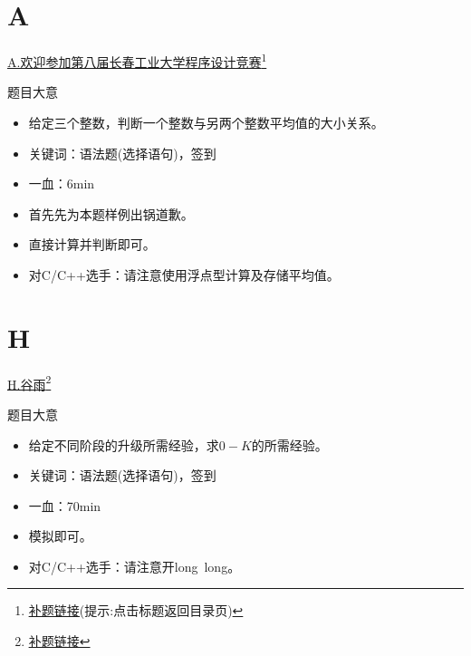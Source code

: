 \documentclass{beamer}
\begin{document}
    \section{A}
    \hypertarget{A}{}
    \begin{frame}{\hyperlink{toc}{A.欢迎参加第八届长春工业大学程序设计竞赛}\footnote{\href{https://acm816.cn/p/236}{\underline{补题链接}}(提示:点击标题返回目录页)}}
        \begin{block}{题目大意}
            \begin{itemize}
                \item 给定三个整数，判断一个整数与另两个整数平均值的大小关系。
                \item 关键词：语法题(选择语句)，签到
                \item 一血：6min
            \end{itemize}
        \end{block}
        \begin{itemize}
            \item 首先先为本题样例出锅道歉。
            \item 直接计算并判断即可。
            \item 对C/C++选手：请注意使用浮点型计算及存储平均值。
        \end{itemize}
    \end{frame}
    \section{H}
    \hypertarget{H}{}
    \begin{frame}{\hyperlink{toc}{H.谷雨}\footnote{\href{https://acm816.cn/p/243}{\underline{补题链接}}}}
        \begin{block}{题目大意}
            \begin{itemize}
                \item 给定不同阶段的升级所需经验，求$0-K$的所需经验。
                \item 关键词：语法题(选择语句)，签到
                \item 一血：70min
            \end{itemize}
        \end{block}
        \begin{itemize}
            \item 模拟即可。
            \item 对C/C++选手：请注意开long\ long。
        \end{itemize}
    \end{frame}
\end{document}
